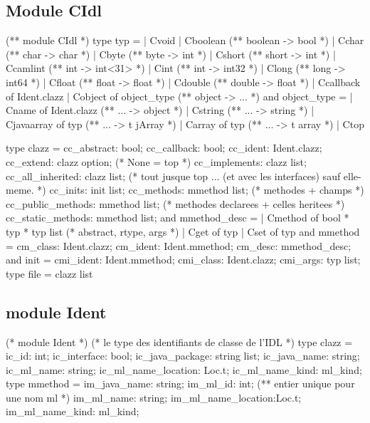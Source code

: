 \documentclass[a4paper, 11pt]{report}
\begin{document}
\subsection*{Module CIdl}
\begin{OCaml}
(**  module CIdl  *)
type typ =
  | Cvoid
  | Cboolean (** boolean -> bool *)
  | Cchar (** char -> char *)
  | Cbyte (** byte -> int *)
  | Cshort (** short -> int *)
  | Ccamlint (** int -> int<31> *)
  | Cint (** int -> int32 *)
  | Clong (** long -> int64 *)
  | Cfloat (** float -> float *)
  | Cdouble (** double -> float *)
  | Ccallback of Ident.clazz
  | Cobject of object_type (** object -> ... *)
and object_type = 
  | Cname of Ident.clazz (** ... -> object *)
  | Cstring (** ... -> string *)
  | Cjavaarray of typ (** ... -> t jArray *) 
  | Carray of typ (** ... -> t array *) 
  | Ctop

type clazz = {
    cc_abstract: bool;
    cc_callback: bool;
    cc_ident: Ident.clazz;
    cc_extend: clazz option; (* None = top *)
    cc_implements: clazz list;
    cc_all_inherited: clazz list; (* tout jusque top ... (et avec les interfaces) sauf elle-meme. *)
    cc_inits: init list;
    cc_methods: mmethod list; (* methodes + champs *)
    cc_public_methods: mmethod list; (* methodes declarees + celles heritees *)
    cc_static_methods: mmethod list; 
  }
and mmethod_desc = 
  | Cmethod of bool * typ * typ list (* abstract, rtype, args *)
  | Cget of typ
  | Cset of typ
and mmethod = {
    cm_class: Ident.clazz;
    cm_ident: Ident.mmethod; 
    cm_desc: mmethod_desc;
  }         
and init = {
    cmi_ident: Ident.mmethod;
    cmi_class: Ident.clazz;
    cmi_args: typ list;
  }
type file = clazz list
\end{OCaml}
\subsection*{module Ident}
\begin{OCaml}
(* module Ident  *)
(* le type des identifiants de classe de l'IDL *)
type clazz = {
    ic_id: int;
    ic_interface: bool;
    ic_java_package: string list;
    ic_java_name: string;
    ic_ml_name: string;
    ic_ml_name_location: Loc.t;
    ic_ml_name_kind: ml_kind;
  }
type mmethod = {
    im_java_name: string;
    im_ml_id: int; (** entier unique pour une nom ml *)
    im_ml_name: string;
    im_ml_name_location:Loc.t;
    im_ml_name_kind: ml_kind;
  }
\end{OCaml}
\end{document}
